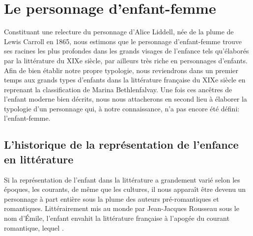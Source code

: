 \chapter{Le personnage d'enfant-femme}

\begin{flushright}
\end{flushright}


Constituant une relecture du personnage d'Alice Liddell, née de la plume de
Lewis Carroll en 1865, nous estimons que le personnage d'enfant-femme trouve ses
racines les plus profondes dans les grands visages de l'enfance tels qu'élaborés
par la littérature du XIXe siècle, par ailleurs très riche en personnages
d'enfants. Afin de bien établir notre propre typologie, nous reviendrons dans un
premier temps aux grands types d'enfants dans la littérature française du XIXe
siècle en reprenant la classification de Marina Bethlenfalvay. Une fois ces
ancêtres de l'enfant moderne bien décrits, nous nous attacherons en second lieu à
élaborer la typologie d'un personnage qui, à notre connaissance, n'a pas encore
été défini: l'enfant-femme.

\section{L'historique de la représentation de l'enfance en littérature} Si la
représentation de l'enfant dans la littérature a grandement varié selon les
époques, les courants, de même que les cultures, il nous apparaît être devenu un
personnage à part entière sous la plume des auteurs pré-romantiques et
romantiques. Littérairement mis au monde par Jean-Jacques Rousseau sous le nom
d'Émile, l'enfant envahit la littérature française à l'apogée du courant
romantique, lequel .

